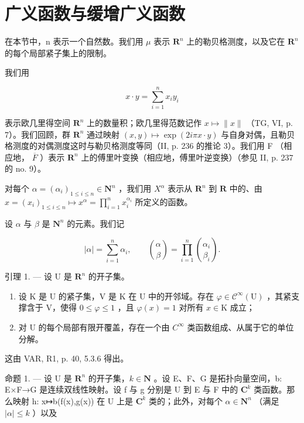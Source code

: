 \section{广义函数与缓增广义函数}

在本节中，n 表示一个自然数。我们用 \(\mu\) 表示 \(\mathbf{R}^{n}\) 上的勒贝格测度，以及它在 \(\mathbf{R}^{n}\) 的每个局部紧子集上的限制。

我们用

\[
x \cdot y = \sum_ {i = 1} ^ {n} x _ {i} y _ {i}
\]

表示欧几里得空间 \(\mathbf{R}^{n}\) 上的数量积；欧几里得范数记作 \(x \mapsto \|x\|\) （TG, VI, p. 7）。我们回顾，群 \(\mathbf{R}^{n}\) 通过映射 \((x, y) \mapsto \exp(2i\pi x \cdot y)\) 与自身对偶，且勒贝格测度的对偶测度这时与勒贝格测度等同（II, p. 236 的推论 3）。我们用 F （相应地， \(\overline{F}\) ）表示 \(\mathbf{R}^{n}\) 上的傅里叶变换（相应地，傅里叶逆变换）（参见 II, p. 237 的 no. 9）。

对每个 \(\alpha = (\alpha_{i})_{1\leqslant i\leqslant n}\in \mathbf{N}^{n}\) ，我们用 \(X^{\alpha}\) 表示从 \(\mathbf{R}^n\) 到 \(\mathbf{R}\) 中的、由 \(x = (x_{i})_{1\leqslant i\leqslant n}\mapsto x^{\alpha} = \prod_{i = 1}^{n}x_{i}^{\alpha_{i}}\) 所定义的函数。

设 \(\alpha\) 与 \(\beta\) 是 \(\mathbf{N}^n\) 的元素。我们记

\[
| \alpha | = \sum_ {i = 1} ^ {n} \alpha_ {i}, \qquad \binom{\alpha}{\beta} = \prod_ {i = 1} ^ {n} \binom{\alpha_ {i}}{\beta_ {i}}.
\]

引理 1. --- 设 U 是 \(\mathbf{R}^{n}\) 的开子集。

\begin{enumerate}
\def\labelenumi{\alph{enumi})}
\item
  设 K 是 U 的紧子集，V 是 K 在 U 中的开邻域。存在 \(\varphi \in \mathcal{C}^{\infty}(\mathrm{U})\) ，其紧支撑含于 V，使得 \(0 \leqslant \varphi \leqslant 1\) ，且 \(\varphi(x) = 1\) 对所有 \(x \in \mathrm{K}\) 成立；
\item
  对 U 的每个局部有限开覆盖，存在一个由 \(C^{\infty}\) 类函数组成、从属于它的单位分解。
\end{enumerate}

这由 VAR, R1, p. 40, 5.3.6 得出。

命题 1. --- 设 U 是 \(\mathbf{R}^{n}\) 的开子集，\(k\in\mathbf{N}\) 。设 E、F、G 是拓扑向量空间，b: E×F→G 是连续双线性映射。设 f 与 g 分别是 U 到 E 与 F 中的 \(\mathbf{C}^{k}\) 类函数。那么映射 h: x↦b(f(x),g(x)) 在 U 上是 \(\mathbf{C}^{k}\) 类的；此外，对每个 \(\alpha\in\mathbf{N}^{n}\) （满足 \(|\alpha|\leqslant k\) ）以及

